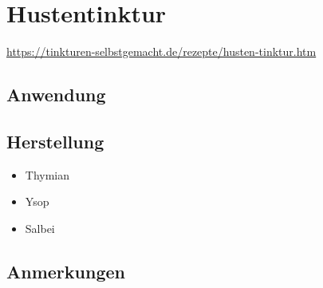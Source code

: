 \section{Hustentinktur}

\cite{tinkturen}  

\url{https://tinkturen-selbstgemacht.de/rezepte/husten-tinktur.htm} 


\subsection{Anwendung}

\subsection{Herstellung}

\begin{itemize}
	\item Thymian
	\item Ysop
	\item Salbei
\end{itemize}

\subsection{Anmerkungen}










